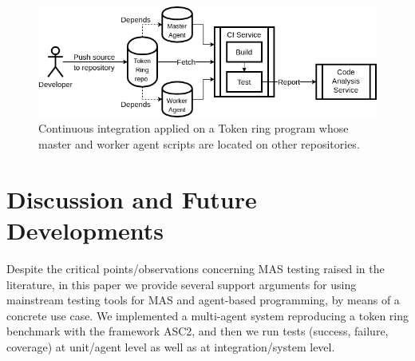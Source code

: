 \begin{figure}[t!]
  \centering
  \hspace{-5pt}
  \includegraphics[width=0.75\linewidth]{ch5/ci.png}
  \caption{Continuous integration applied on a Token ring program whose master and worker agent scripts are located on other repositories.}
  \label{fig:ci}
\end{figure}


\section{Discussion and Future Developments}
\label{sec:discussion}

Despite the critical points/observations concerning MAS testing raised in the literature, in this paper we %
provide several support arguments for using  mainstream testing tools for MAS and agent-based programming, by means of a concrete use case. We implemented a multi-agent system reproducing a token ring benchmark with the framework ASC2, and then we run tests (success, failure, coverage) at unit/agent level as well as at integration/system level. 




